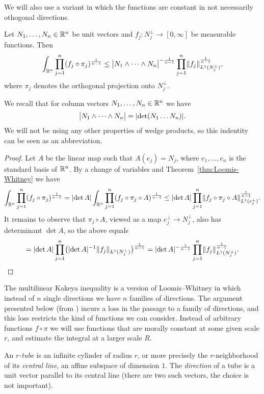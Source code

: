 We will also use a variant in which the functions are constant in not necessarily othogonal directions.
\begin{corollary}\label{cor:aff-inv-Loomis-Whitney}
Let $N_{1},\dotsc,N_{n} \in \R^{n}$ be unit vectors and $f_{j} : N_{j}^{\perp} \to [0,\infty]$ be measurable functions.
Then
\begin{equation}\label{eq:aff-inv-Loomis-Whitney}
\int_{\R^n} \prod_{j=1}^n (f_j \circ \pi_j)^{\frac{1}{n-1}}
\le
\abs[\big]{ N_{1} \wedge \dotsb \wedge N_{n} }^{-\frac{1}{n-1}}
\prod_{j=1}^n \norm{ f_j }_{L^1(N_{j}^{\perp})}^{\frac{1}{n-1}},
\end{equation}
where $\pi_{j}$ denotes the orthogonal projection onto $N_{j}^{\perp}$.
\end{corollary}
We recall that for column vectors $N_{1},\dotsc,N_{n} \in \R^{n}$ we have
\[
\abs[\big]{ N_{1} \wedge \dotsb \wedge N_{n} }
=
\abs*{ \det ( N_{1} \dots N_{n} )}.
\]
We will not be using any other properties of wedge products, so this indentity can be seen as an abbreviation.
\begin{proof}
Let $A$ be the linear map such that $A(e_{j})=N_{j}$, where $e_{1},\dotsc,e_{n}$ is the standard basis of $\R^{n}$.
By a change of variables and Theorem~\ref{thm:Loomis-Whitney} we have
\[
\int_{\R^n} \prod_{j=1}^n (f_j \circ \pi_j)^{\frac{1}{n-1}}
=
\abs{\det A} \int_{\R^n} \prod_{j=1}^n (f_j \circ \pi_j \circ A)^{\frac{1}{n-1}}
\leq
\abs{\det A} \prod_{j=1}^n \norm{f_j \circ \pi_j \circ A}_{L^{1}(e_{j}^{\perp})}^{\frac{1}{n-1}}.
\]
It remains to observe that $\pi_{j} \circ A$, viewed as a map $e_{j}^{\perp} \to N_{j}^{\perp}$, also has determinant $\det A$, so the above equals
\[
=
\abs{\det A} \prod_{j=1}^n \bigl( \abs{\det A}^{-1} \norm{f_j}_{L^{1}(N_{j}^{\perp})} \bigr)^{\frac{1}{n-1}}
=
\abs{\det A}^{-\frac{1}{n-1}} \prod_{j=1}^n \norm{f_j}_{L^{1}(N_{j}^{\perp})}^{\frac{1}{n-1}}.
\qedhere
\]
\end{proof}

The multilinear Kakeya inequality \cite{MR2275834} is a version of Loomis--Whitney in which instead of $n$ single directions we have $n$ families of directions.
The argument presented below (from \cite{MR3300318}) incurs a loss in the passage to a family of directions, and this loss restricts the kind of functions we can consider.
Instead of arbitrary functions $f \circ \pi$ we will use functions that are morally constant at some given scale $r$, and estimate the integral at a larger scale $R$.

An \emph{$r$-tube} is an infinite cylinder of radius $r$, or more precisely the $r$-neighborhood of its \emph{central line}, an affine subspace of dimension $1$.
The \emph{direction} of a tube is a unit vector parallel to its central line (there are two such vectors, the choice is not important).

